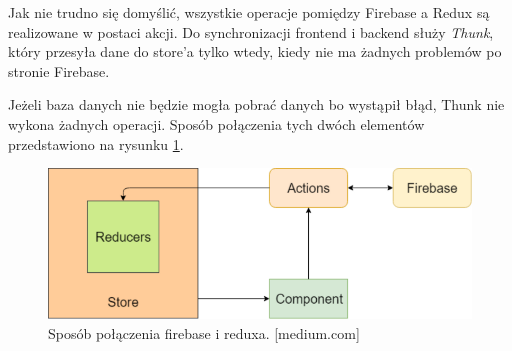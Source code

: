 Jak nie trudno się domyślić, wszystkie operacje pomiędzy Firebase a Redux są realizowane w postaci akcji.
Do synchronizacji frontend i backend służy \textit{Thunk},
który przesyła dane do store’a tylko wtedy,
kiedy nie ma żadnych problemów po stronie Firebase.

Jeżeli baza danych nie będzie mogła pobrać danych bo wystąpił błąd,
Thunk nie wykona żadnych operacji. Sposób połączenia tych dwóch elementów przedstawiono
na rysunku \ref{rys:fireRedux}.

\begin{figure}[H]
	\centering\includegraphics[width=.8\textwidth]{img/fireRedux}
	\caption{Sposób połączenia firebase i reduxa. [medium.com]}\label{rys:fireRedux}%
\end{figure}
